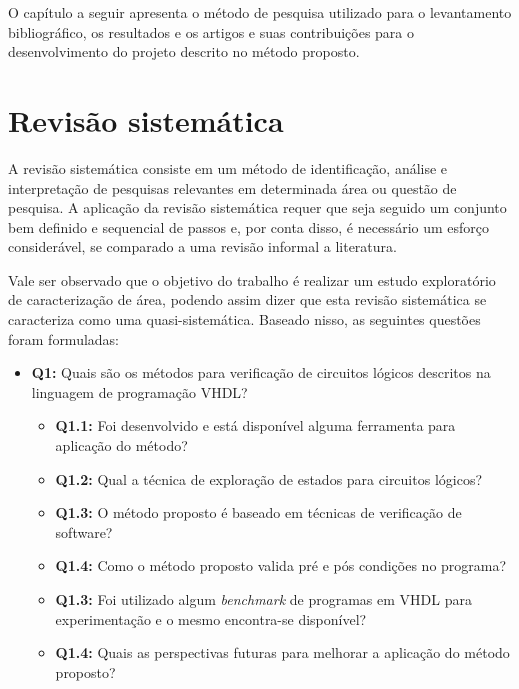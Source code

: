 \label{chapter:correlatos}
O capítulo a seguir apresenta o método de pesquisa utilizado para o levantamento bibliográfico, os resultados e os artigos e suas contribuições para o desenvolvimento do projeto descrito no método proposto.

\section{Revisão sistemática}
\par
A revisão sistemática consiste em um método de identificação, análise e interpretação de pesquisas relevantes em determinada área ou questão de pesquisa\cite{kitchenham2004procedures}. A aplicação da revisão sistemática requer que seja seguido um conjunto bem definido e sequencial de passos e, por conta disso, é necessário um esforço considerável, se comparado a uma revisão informal a literatura\cite{MafraTravassos}.

\par
Vale ser observado que o objetivo do trabalho é realizar um estudo exploratório de caracterização de área, podendo assim dizer que esta revisão sistemática se caracteriza como uma quasi-sistemática\cite{travassos2008environment}. Baseado nisso, as seguintes questões foram formuladas:
\begin{itemize}
\item \textbf{Q1:} Quais são os métodos para verificação de circuitos lógicos descritos na linguagem de programação VHDL?
	\begin{itemize}
	\item \textbf{Q1.1:} Foi desenvolvido e está disponível alguma ferramenta para aplicação do método?
	\item \textbf{Q1.2:} Qual a técnica de exploração de estados para circuitos lógicos?
	\item \textbf{Q1.3:} O método proposto é baseado em técnicas de verificação de software?
	\item \textbf{Q1.4:} Como o método proposto valida pré e pós condições no programa?
	\item \textbf{Q1.3:} Foi utilizado algum \textit{benchmark} de programas em VHDL para experimentação e o mesmo encontra-se disponível?
	\item \textbf{Q1.4:} Quais as perspectivas futuras para melhorar a aplicação do método proposto?
	\end{itemize}
\end{itemize}

